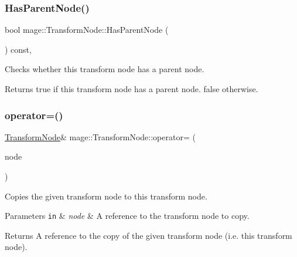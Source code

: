 \subsubsection{\texorpdfstring{Has\+Parent\+Node()}{HasParentNode()}}
{\footnotesize\ttfamily bool mage\+::\+Transform\+Node\+::\+Has\+Parent\+Node (\begin{DoxyParamCaption}{ }\end{DoxyParamCaption}) const\hspace{0.3cm}{\ttfamily [private]}, {\ttfamily [noexcept]}}

Checks whether this transform node has a parent node.

\begin{DoxyReturn}{Returns}
{\ttfamily true} if this transform node has a parent node. {\ttfamily false} otherwise. 
\end{DoxyReturn}
\hypertarget{structmage_1_1_transform_node_afd5f7d7b377b1a85cbe1d64f8f0df49a}{}\label{structmage_1_1_transform_node_afd5f7d7b377b1a85cbe1d64f8f0df49a} 
\subsubsection{\texorpdfstring{operator=()}{operator=()}\hspace{0.1cm}{\footnotesize\ttfamily [1/2]}}
{\footnotesize\ttfamily \hyperlink{structmage_1_1_transform_node}{Transform\+Node}\& mage\+::\+Transform\+Node\+::operator= (\begin{DoxyParamCaption}\item[{const \hyperlink{structmage_1_1_transform_node}{Transform\+Node} \&}]{node }\end{DoxyParamCaption})\hspace{0.3cm}{\ttfamily [delete]}}

Copies the given transform node to this transform node.


\begin{DoxyParams}[1]{Parameters}
\mbox{\tt in}  & {\em node} & A reference to the transform node to copy. \\
\hline
\end{DoxyParams}
\begin{DoxyReturn}{Returns}
A reference to the copy of the given transform node (i.\+e. this transform node). 
\end{DoxyReturn}
\hypertarget{structmage_1_1_transform_node_a8dcd5a36ad95917216df628d309b294d}{}\label{structmage_1_1_transform_node_a8dcd5a36ad95917216df628d309b294d} 
